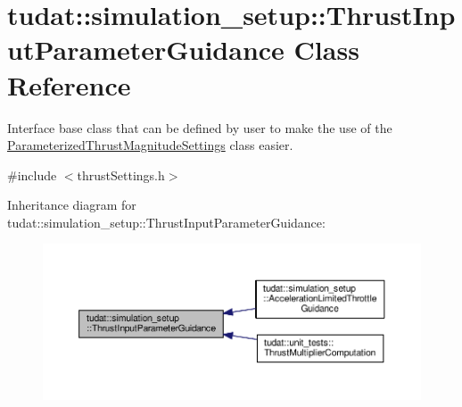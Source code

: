 \hypertarget{classtudat_1_1simulation__setup_1_1ThrustInputParameterGuidance}{}\section{tudat\+:\+:simulation\+\_\+setup\+:\+:Thrust\+Input\+Parameter\+Guidance Class Reference}
\label{classtudat_1_1simulation__setup_1_1ThrustInputParameterGuidance}


Interface base class that can be defined by user to make the use of the \hyperlink{classtudat_1_1simulation__setup_1_1ParameterizedThrustMagnitudeSettings}{Parameterized\+Thrust\+Magnitude\+Settings} class easier.  




{\ttfamily \#include $<$thrust\+Settings.\+h$>$}



Inheritance diagram for tudat\+:\+:simulation\+\_\+setup\+:\+:Thrust\+Input\+Parameter\+Guidance\+:
\nopagebreak
\begin{figure}[H]
\begin{center}
\leavevmode
\includegraphics[width=350pt]{classtudat_1_1simulation__setup_1_1ThrustInputParameterGuidance__inherit__graph}
\end{center}
\end{figure}

